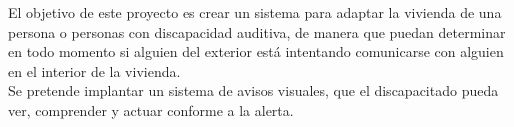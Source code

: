 El objetivo de este proyecto es crear un sistema para adaptar la vivienda de una persona o personas con discapacidad auditiva, de manera que puedan determinar en todo momento si alguien del exterior está intentando comunicarse con alguien en el interior de la vivienda. \\

Se pretende implantar un sistema de avisos visuales, que el discapacitado pueda ver, comprender y actuar conforme a la alerta.